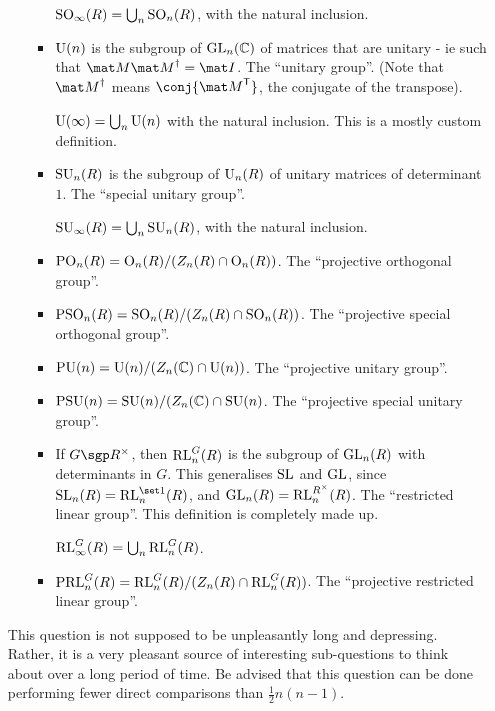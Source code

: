 \documentclass[a4paper,12pt]{article}
\begin{document}
\begin{enumerate}[leftmargin=*]
\begin{itemize}
\begin{itemize}
      \(\mathrm{SO}_\infty(R) = \bigcup_n \mathrm{SO}_n(R)\), with the natural inclusion.
     \item
      \(\mathrm{U}(n)\) is the subgroup of \(\mathrm{GL}_n(\mathbb C)\) of matrices that are unitary -
      ie such that \(\mat M \herm{\mat M} = \mat I\).
      The ``unitary group''. (Note that \(\herm{\mat M}\) means
      \(\conj{\tran{\mat M}}\), the conjugate of the transpose).

      \(\mathrm{U}(\infty) = \bigcup_n \mathrm{U}(n)\) with the natural inclusion. This is a
      mostly custom definition.
     \item
      \(\mathrm{SU}_n(R)\) is the subgroup of \(\mathrm{U}_n(R)\) of unitary matrices of
      determinant \(1\). The ``special unitary group''.

      \(\mathrm{SU}_\infty(R) = \bigcup_n \mathrm{SU}_n(R)\), with the natural inclusion.
     \item
      \(\mathrm{PO}_n(R) = \mathrm{O}_n(R) / (Z_n(R) \cap \mathrm{O}_n(R))\). The ``projective
      orthogonal group''.

     \item
      \(\mathrm{PSO}_n(R) = \mathrm{SO}_n(R) / (Z_n(R) \cap \mathrm{SO}_n(R))\). The ``projective
      special orthogonal group''.

     \item
      \(\mathrm{PU}(n) = \mathrm{U}(n) / (Z_n(\mathbb C) \cap \mathrm{U}(n))\). The ``projective unitary
      group''.

     \item
      \(\mathrm{PSU}(n) = \mathrm{SU}(n) / (Z_n(\mathbb C) \cap \mathrm{SU}(n)\). The ``projective special
      unitary group''.

     \item
      If \(G \sgp R^\times\), then \(\mathrm{RL}_n^G(R)\) is the subgroup of
      \(\mathrm{GL}_n(R)\) with determinants in \(G\). This generalises \(\mathrm{SL}\) and
      \(\mathrm{GL}\), since \(\SL_n(R) = \RL_n^{\set 1}(R)\), and
      \(\mathrm{GL}_n(R) = \mathrm{RL}_n^{R^\times}(R)\).
      The ``restricted linear group''. This definition is completely made up.

      \(\mathrm{RL}_\infty^G(R) = \bigcup_n \mathrm{RL}_n^G(R)\).
     \item
      \(\mathrm{PRL}_n^G(R) = \mathrm{RL}_n^G(R) / (Z_n(R) \cap \mathrm{RL}_n^G(R))\). The ``projective
      restricted linear group''.

    \end{itemize}
  \end{itemize}
  This question is not supposed to be unpleasantly long and depressing.
  Rather, it is a very pleasant source of interesting sub-questions to think
  about over a long period of time.
  Be advised that this question can be done performing
  fewer direct comparisons than \(\tfrac 12 n(n - 1)\).


\end{enumerate}
\end{document}

